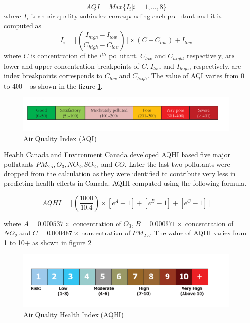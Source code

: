 \begin{equation}
AQI = Max \{I_i|i = 1, ..., 8\}
\end{equation}
where $I_i$ is an air quality subindex corresponding each pollutant and it is computed as 
\begin{equation}
I_i = \lceil(\frac{I_{high} - I_{low}}{C_{high} - C_{low}})\rceil \times (C - C_{low}) + I_{low}
\end{equation}
where $C$ is concentration of the $i^{th}$ pollutant. $C_{low}$ and $C_{high}$, respectively, are lower and upper concentration breakpoints of $C$.
$I_{low}$ and $I_{high}$, respectively, are index breakpoints corresponds to $C_{low}$ and $C_{high}$.  The value of AQI varies from 0 to 400+ as shown in the figure \ref{aqi}.
\begin{figure}[h]
    \begin{center}
    \includegraphics[scale=0.58]{./images/figure13.png}
    \end{center}
   
    \caption{Air Quality Index (AQI) \cite{AirQualityIndex}}
    
    \label{aqi}
\end{figure}

Health Canada and Environment Canada developed AQHI based five major pollutants 
$PM_{2.5}, O_3, NO_2, SO_2,$ and $CO$. Later the last two pollutants were dropped from the calculation as they were identified to  contribute very less in predicting health effects in Canada. AQHI computed using the following formula.


\begin{equation}
AQHI = \lceil (\frac{1000}{10.4}) \times [e^A-1]+[e^B-1]+[e^C-1] \rceil
\end{equation}

where $ A = 0.000537 \times$ concentration of  $O_3$, $B = 0.000871 \times$ concentration  of $NO_2$ and  $C = 0.000487 \times$ concentration of $PM_{2.5}$.
The value of AQHI varies from 1 to 10+ as shown in figure \ref{aqhi}


\begin{figure}[h]
    \begin{center}
    \includegraphics[scale=0.58]{./images/figure12.png}
    \end{center}
   
    \caption{Air Quality Health Index (AQHI) \cite{healthcanada}}
    
    \label{aqhi}
\end{figure}

